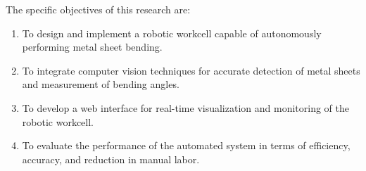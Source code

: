 The specific objectives of this research are:
\begin{enumerate}
    \item To design and implement a robotic workcell capable of autonomously performing metal sheet bending.
    \item To integrate computer vision techniques for accurate detection of metal sheets and measurement of bending angles.
    \item To develop a web interface for real-time visualization and monitoring of the robotic workcell.
    \item To evaluate the performance of the automated system in terms of efficiency, accuracy, and reduction in manual labor.
\end{enumerate}